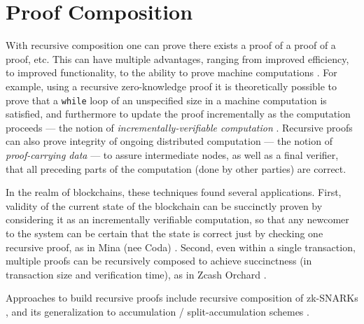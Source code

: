 \section{Proof Composition}
\label{paradigms:proof-composition}

With recursive composition one can prove there exists a proof of a proof of a proof, etc.
This can have multiple advantages, ranging from improved efficiency, to improved functionality, to the ability to prove machine computations \cite{2014:crypto:Scalable-ZK-via-Cycles-of-EC}.
For example, using a recursive zero-knowledge proof it is theoretically possible to prove that a \texttt{while} loop of an unspecified size in a machine computation is satisfied, and furthermore to update the proof incrementally as the computation proceeds --- the notion of \emph{incrementally-verifiable computation} \cite{Valiant08incrementally}.
Recursive proofs can also prove integrity of ongoing distributed computation --- the notion of \emph{proof-carrying data} \cite{2010:ICS:proof-carrying-data,CTV15cluster} --- to assure intermediate nodes, as well as a final verifier, that all preceding parts of the computation (done by other parties) are correct.



In the realm of blockchains, these techniques found several applications.
First, validity of the current state of the blockchain can be succinctly proven by considering it as an incrementally verifiable computation, so that any newcomer to the system can be certain that the state is correct just by checking one recursive proof, as in Mina (nee Coda) \cite{RMRS20coda}.
Second, even within a single transaction, multiple proofs can be recursively composed to achieve succinctness (in transaction size and verification time), as in Zcash Orchard \cite{2021:HGBNL:ZIP224}.

Approaches to build recursive proofs include recursive composition of zk-SNARKs \cite{Valiant08incrementally,2010:ICS:proof-carrying-data,2013:Recursive-Composition-and-Bootstrapping-for-SNARKS-and-Proof-carrying-Data,2014:crypto:Scalable-ZK-via-Cycles-of-EC}, and its generalization to accumulation / split-accumulation schemes \cite{haloBgh2019,tcc/BunzCMS20,2020:COS:Fractal,boneh2020halo}.

